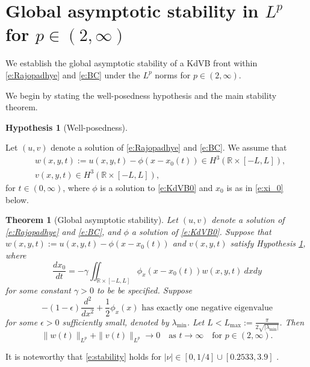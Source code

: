 \documentclass[final,11pt]{article}
\theoremstyle{definition} %
\newcommand{\R}{\mathbb{R}}
\theoremstyle{plain}
\newtheorem{theorem}{Theorem}[section]
\theoremstyle{definition} %
\newtheorem{hyp}{Hypothesis}
\theoremstyle{remark}
\begin{document}
\section{Global asymptotic stability in \texorpdfstring{$L^p$}{} for \texorpdfstring{$p \in (2,\infty)$}{}}\label{s:stab}

We establish the global asymptotic stability of a KdVB front within \eqref{e:Rajopadhye} and \eqref{e:BC} under the $L^p$ norms for $p \in (2,\infty)$. 

We begin by stating the well-posedness hypothesis and the main stability theorem.

\begin{hyp}[Well-posedness]\label{hyp:1}

Let $(u, v)$ denote a solution of \eqref{e:Rajopadhye} and \eqref{e:BC}. We assume that 
 \begin{align*}
 &w(x,y, t) := u(x,y,t) - \phi(x- x_0(t)) \in H^3(\R \times [-L,L]),\\
 &v(x,y, t) \in H^3(\R \times [-L,L]), 
 \end{align*}
for $t\in(0,\infty)$, where $\phi$ is a solution to \eqref{e:KdVB0} and $x_0$ is as in \eqref{e:xi_0} below.
\end{hyp}

\begin{theorem}[Global asymptotic stability]\label{t:p>2}
Let $(u, v)$ denote a solution of \eqref{e:Rajopadhye} and \eqref{e:BC}, and $\phi$ a solution of \eqref{e:KdVB0}. Suppose that $w(x,y,t):=u(x,y,t) - \phi(x - x_0(t))$ and $v(x,y,t)$ satisfy Hypothesis \ref{hyp:1}, where 
\begin{equation}\label{e:xi_0}
\frac{dx_0}{dt} = -\gamma \iint_{\R\times[-L,L]} \phi_x(x-x_0(t))w(x,y,t)~dxdy 
\end{equation}
for some constant $\gamma>0$ to be be specified.
Suppose 
\begin{equation}\label{e:stability}
\text{$-(1-\epsilon)\frac{d^2}{dx^2}+\frac12\phi_x(x)$ has exactly one negative eigenvalue}
\end{equation}
for some $\epsilon>0$ sufficiently small, denoted by $\lambda_{\min}$. Let $L < L_{\max} := \frac{\pi}{2\sqrt{|\lambda_{\min}|}}$.  Then 
\[
\|w(t)\|_{L^p} + \| v(t)\|_{L^p} \to 0 \quad \text{as $t \to \infty$} \quad \text{for $p\in(2,\infty)$}.
\]
\end{theorem}

It is noteworthy that \eqref{e:stability} holds for $|\nu| \in [0, 1/4] \cup [0.2533, 3.9]$ \cite{BARKER2025}. 
\end{document}
